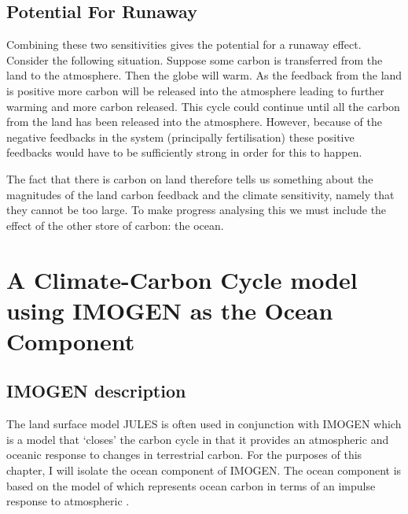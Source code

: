 \subsection{Potential For Runaway}
Combining these two sensitivities gives the potential for a runaway effect. Consider the following situation. Suppose some carbon is transferred from the land to the atmosphere. Then the globe
will warm. As the feedback from the land is positive more carbon will be released into the atmosphere leading to further warming and more carbon released. This cycle could continue until all the
carbon from the land has been released into the atmosphere. However, because of the negative feedbacks in the system (principally  fertilisation) these positive feedbacks would have to be
sufficiently strong in order for this to happen.

The fact that there is carbon on land therefore tells us something about the magnitudes of the land carbon feedback and the climate sensitivity, namely that they cannot be too large.
To make progress analysing this we must include the effect of the other store of carbon: the ocean.

\section{A Climate-Carbon Cycle model using IMOGEN as the Ocean Component}
\subsection{IMOGEN description}
The land surface model JULES is often used in conjunction with IMOGEN \parencite{Huntingford2004,Huntingford2010} which is a model that `closes' the carbon cycle in that it provides
an atmospheric and oceanic response to changes in terrestrial carbon. For the purposes of this chapter, I will isolate the ocean component of IMOGEN\@. The ocean component is based on the
model of \cite{Joos1996} which represents ocean carbon in terms of an impulse response to atmospheric .

